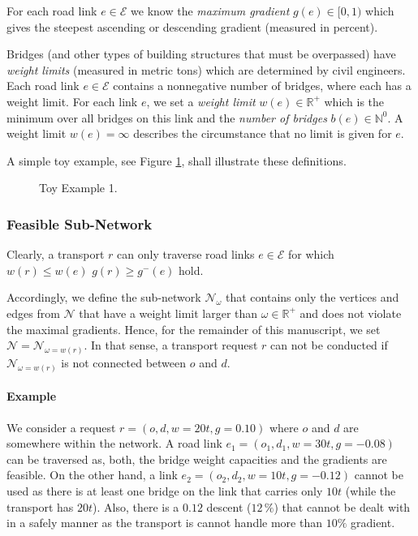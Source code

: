 For each road link  $e \in \mathcal{E}$ we know the \emph{maximum gradient} $g(e) \in [0,1)$ which gives the steepest ascending or descending gradient (measured in percent).

Bridges (and other types of building structures that must be overpassed)
have \emph{weight limits} (measured in metric tons) which are determined by civil engineers.
Each road link $e \in \mathcal{E}$ contains a nonnegative number of bridges, where each has a weight limit.
For each link $e$, we set a \emph{weight limit} $w(e) \in \mathbb{R}^{+}$ which is the
minimum over all bridges on this link and the \emph{number of bridges} $b(e) \in \mathbb{N}^{0}$.
A weight limit $w(e)= \infty$ describes the circumstance
that no limit is given for $e$.

A simple toy example, see Figure \ref{fig_toy_example_1}, shall illustrate these definitions.
\begin{figure}[!ht]
  \centering
  
  \caption{Toy Example 1.}
  \label{fig_toy_example_1}
\end{figure}


\subsubsection{Feasible Sub-Network}

Clearly, a transport $r$ can only traverse road links $e \in \mathcal{E}$ for which $w(r) \leq w(e)$
 $g(r)\geq g^-(e)$ hold.

Accordingly, we define the sub-network $\mathcal{N}_{\omega}$ that contains only the vertices and edges from $\mathcal{N}$ that have a weight limit larger than $\omega \in \mathbb{R}^{+}$ and
does not violate the maximal gradients.
Hence, for the remainder of this manuscript, we set $\mathcal{N}=\mathcal{N}_{\omega=w(r)}$.
In that sense, a transport request $r$ can not be conducted if $\mathcal{N}_{\omega=w(r)}$ is not
connected between $o$ and $d$.

\paragraph{Example}
We consider a request $r=(o,d,w=20t, g=0.10)$ where $o$ and $d$ are somewhere within the network. A road link $e_1=(o_1,d_1, w=30t, g=-0.08)$  can be traversed as, both, the bridge weight capacities and the gradients are feasible. On the other hand,  a link
$e_2=(o_2,d_2, w=10t, g=-0.12)$ cannot be used as there is at least one bridge
on the link that carries only $10t$ (while the transport has $20t$). Also, there
is a $0.12$ descent ($12\,\%$) that cannot be dealt with in a safely manner as the
transport is cannot handle more than $10\%$ gradient.




